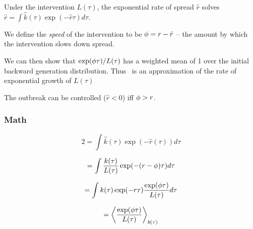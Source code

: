 \documentclass[12pt]{article}
\begin{document}
Under the intervention $L(\tau)$, the exponential rate of spread $\hat r$ solves $\hat r = \int{\hat k(\tau) \exp(-\hat r\tau) d\tau}$. 

We define the \emph{speed} of the intervention to be $\phi = r-\hat r$ -- the amount by which the intervention slows down spread. 

We can then show that $\exp(\phi\tau)/L(\tau)$ has a weighted mean of 1 over the initial backward generation distribution. Thus \speed\ is an approximation of the rate of exponential growth of $L(\tau)$

The outbreak can be controlled ($\hat r<0$) iff $\phi > r$.

\subsubsection*{Math}

$$2 = \int{\hat k(\tau)\exp(-\hat r(\tau)) d\tau}$$

$$ = \int{\frac{k(\tau)}{L(\tau)}\exp(-(r-\ensuremath{\phi})\tau) d\tau} $$

$$ = \int{k(\tau)\exp(-r\tau)\frac{\exp(\ensuremath{\phi}\tau)}{L(\tau)} d\tau} $$

$$ = \left\langle \frac{\exp(\phi\tau)}{L(\tau)} \right\rangle_{b(\tau)}$$
\end{document}
